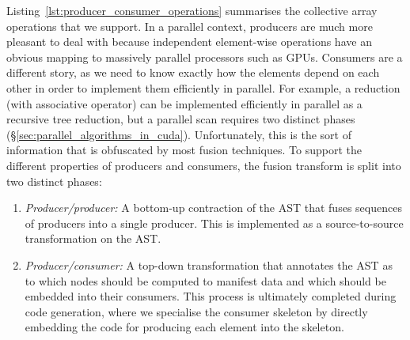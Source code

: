 Listing~\ref{lst:producer_consumer_operations} summarises the collective array operations that we
support. In a parallel context, producers are much more pleasant to deal with
because independent element-wise operations have an obvious mapping to massively
parallel processors such as GPUs. Consumers are a different story, as we need to
know exactly how the elements depend on each other in order to implement them
efficiently in parallel. For example, a reduction (with associative operator)
can be implemented efficiently in parallel as a recursive tree reduction, but a
parallel scan requires two distinct phases
(\S\ref{sec:parallel_algorithms_in_cuda}). Unfortunately, this is the sort of
information that is obfuscated by most fusion techniques. To support the
different properties of producers and consumers, the fusion transform is split
into two distinct phases:
%
\begin{enumerate}
    \item \emph{Producer/producer:} A bottom-up contraction of the AST that
        fuses sequences of producers into a single producer. This is implemented
        as a source-to-source transformation on the AST\@.

    \item \emph{Producer/consumer:} A top-down transformation that annotates the
        AST as to which nodes should be computed to manifest data and which
        should be embedded into their consumers. This process is ultimately
        completed during code generation, where we specialise the consumer
        skeleton by directly embedding the code for producing each element into
        the skeleton.

\end{enumerate}

